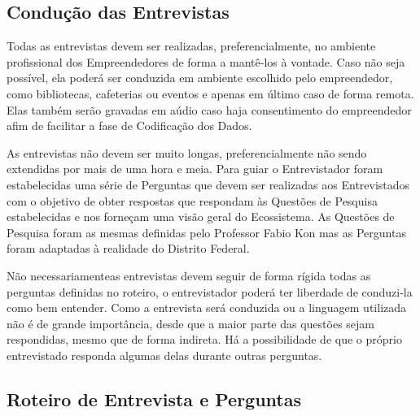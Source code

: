 \subsection{Condução das Entrevistas}
\label{subsection:conducao_das_entrevistas}

Todas as entrevistas devem ser realizadas, preferencialmente, no ambiente profissional dos Empreendedores de forma a mantê-los à vontade. Caso não seja possível, ela poderá ser conduzida em ambiente escolhido pelo empreendedor, como bibliotecas, cafeterias ou eventos e apenas em último caso de forma remota. Elas também serão gravadas em aúdio caso haja consentimento do empreendedor afim de facilitar a fase de Codificação dos Dados.

As entrevistas não devem ser muito longas, preferencialmente não sendo extendidas por mais de uma hora e meia. Para guiar o Entrevistador foram estabelecidas uma série de Perguntas que devem ser realizadas aos Entrevistados com o objetivo de obter respostas que respondam às Questões de Pesquisa estabelecidas e nos forneçam uma visão geral do Ecossistema. As Questões de Pesquisa foram as mesmas definidas pelo Professor Fabio Kon mas as Perguntas foram adaptadas à realidade do Distrito Federal.

Não necessariamenteas entrevistas devem seguir de forma rígida todas as perguntas definidas no roteiro, o entrevistador poderá ter liberdade de conduzi-la como bem entender. Como a entrevista será conduzida ou a linguagem utilizada não é de grande importância, desde que a maior parte das questões sejam respondidas, mesmo que de forma indireta. Há a possibilidade de que o próprio entrevistado responda algumas delas durante outras perguntas. 

\subsection{Roteiro de Entrevista e Perguntas}
\label{subsection:roteiro_de_entrevista_e_perguntas}

